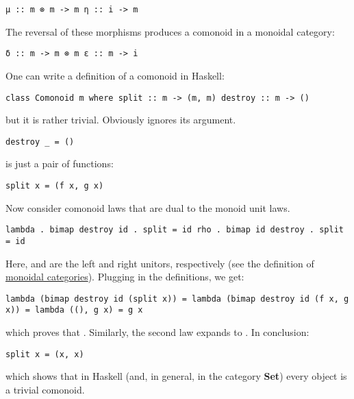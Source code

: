 \begin{verbatim}
μ :: m ⊗ m -> m η :: i -> m
\end{verbatim}

The reversal of these morphisms produces a comonoid in a monoidal
category:

\begin{verbatim}
δ :: m -> m ⊗ m ε :: m -> i
\end{verbatim}

One can write a definition of a comonoid in Haskell:

\begin{verbatim}
class Comonoid m where split :: m -> (m, m) destroy :: m -> ()
\end{verbatim}

but it is rather trivial. Obviously  ignores its
argument.

\begin{verbatim}
destroy _ = ()
\end{verbatim}

 is just a pair of functions:

\begin{verbatim}
split x = (f x, g x)
\end{verbatim}

Now consider comonoid laws that are dual to the monoid unit laws.

\begin{verbatim}
lambda . bimap destroy id . split = id rho . bimap id destroy . split = id
\end{verbatim}

Here,  and  are the left and right unitors,
respectively (see the definition of
\href{https://bartoszmilewski.com/2016/12/27/monads-categorically/}{monoidal
categories}). Plugging in the definitions, we get:

\begin{verbatim}
lambda (bimap destroy id (split x)) = lambda (bimap destroy id (f x, g x)) = lambda ((), g x) = g x
\end{verbatim}

which proves that . Similarly, the second law expands
to . In conclusion:

\begin{verbatim}
split x = (x, x)
\end{verbatim}

which shows that in Haskell (and, in general, in the category
\textbf{Set}) every object is a trivial comonoid.

